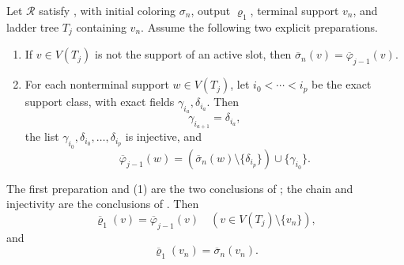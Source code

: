 \begin{lemma}
Let \(\mathcal R\) satisfy
, with initial coloring
\(\sigma_n\), output \(\varrho_1\), terminal support \(v_n\), and ladder
tree \(T_j\) containing \(v_n\).  Assume the following two explicit
preparations.
\begin{enumerate}
\item If \(v\in V(T_j)\) is not the support of an active slot, then
      \(\overline{\sigma}_n(v)=\overline{\varphi}_{j-1}(v)\).
\item For each nonterminal support \(w\in V(T_j)\), let
      \(i_0<\cdots<i_p\) be the exact support class, with exact fields
      \(\gamma_{i_a},\delta_{i_a}\).  Then
      \[
       \gamma_{i_{a+1}}=\delta_{i_a},
      \]
      the list
      \(\gamma_{i_0},\delta_{i_0},\ldots,\delta_{i_p}\) is injective,
      and
      \[
       \overline{\varphi}_{j-1}(w)
       =(\overline{\sigma}_n(w)\setminus\{\delta_{i_p}\})
          \cup\{\gamma_{i_0}\}.                               \tag{1}
      \]
\end{enumerate}
The first preparation and (1) are the two conclusions of
; the chain and injectivity are
the conclusions of .  Then
\[
 \overline{\varrho}_1(v)=\overline{\varphi}_{j-1}(v)
       \quad(v\in V(T_j)\setminus\{v_n\}),                    \tag{2}
\]
and
\[
             \overline{\varrho}_1(v_n)
             =\overline{\sigma}_n(v_n).                       \tag{3}
\]
\end{lemma}
